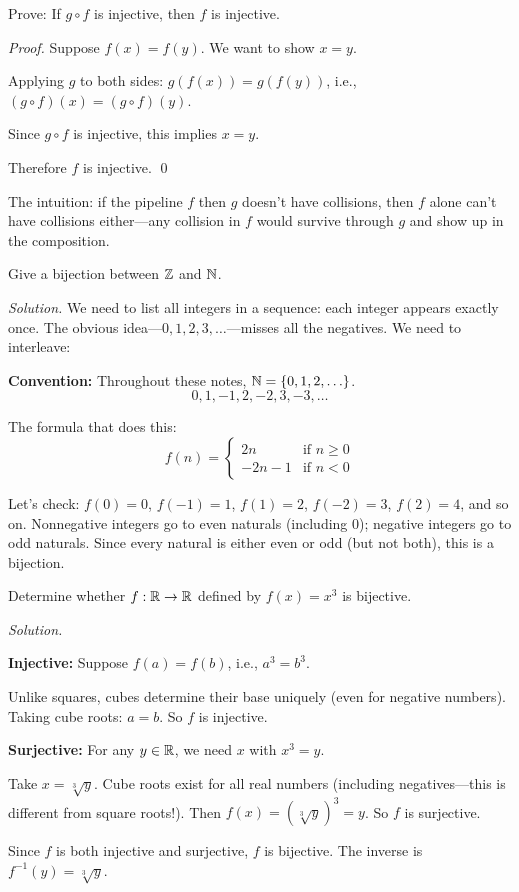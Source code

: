 \begin{example}
Prove: If $g \circ f$ is injective, then $f$ is injective.

\emph{Proof.} Suppose $f(x) = f(y)$. We want to show $x = y$.

Applying $g$ to both sides: $g(f(x)) = g(f(y))$, i.e., $(g \circ f)(x) = (g \circ f)(y)$.

Since $g \circ f$ is injective, this implies $x = y$.

Therefore $f$ is injective. \qed

The intuition: if the pipeline $f$ then $g$ doesn't have collisions, then $f$ alone can't have collisions either---any collision in $f$ would survive through $g$ and show up in the composition.
\end{example}

\begin{example}
Give a bijection between $\mathbb{Z}$ and $\mathbb{N}$.

\emph{Solution.} We need to list all integers in a sequence: each integer appears exactly once. The obvious idea---$0, 1, 2, 3, \ldots$---misses all the negatives. We need to interleave:
\par\noindent\textbf{Convention:} Throughout these notes, $\mathbb{N} = \{0, 1, 2, \ldots\}$.
\[
0, 1, -1, 2, -2, 3, -3, \ldots
\]

The formula that does this:
\[
f(n) = \begin{cases}
2n & \text{if } n \geq 0 \\
-2n - 1 & \text{if } n < 0
\end{cases}
\]

Let's check: $f(0) = 0$, $f(-1) = 1$, $f(1) = 2$, $f(-2) = 3$, $f(2) = 4$, and so on. Nonnegative integers go to even naturals (including 0); negative integers go to odd naturals. Since every natural is either even or odd (but not both), this is a bijection.
\end{example}

\begin{example}
Determine whether $f: \mathbb{R} \to \mathbb{R}$ defined by $f(x) = x^3$ is bijective.

\emph{Solution.}

\textbf{Injective:} Suppose $f(a) = f(b)$, i.e., $a^3 = b^3$.

Unlike squares, cubes determine their base uniquely (even for negative numbers). Taking cube roots: $a = b$. So $f$ is injective.

\textbf{Surjective:} For any $y \in \mathbb{R}$, we need $x$ with $x^3 = y$.

Take $x = \sqrt[3]{y}$. Cube roots exist for all real numbers (including negatives---this is different from square roots!). Then $f(x) = (\sqrt[3]{y})^3 = y$. So $f$ is surjective.

Since $f$ is both injective and surjective, $f$ is bijective. The inverse is $f^{-1}(y) = \sqrt[3]{y}$.
\end{example}

